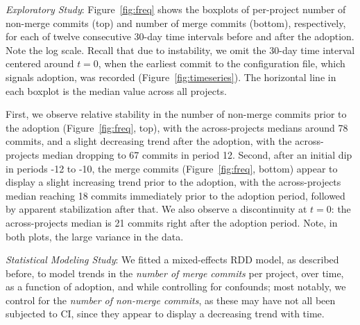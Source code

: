 \smallskip\noindent \emph{Exploratory Study}: 
Figure~\ref{fig:freq} shows the boxplots of per-project number of non-merge 
commits (top) and number of merge commits (bottom), respectively, for each
of twelve consecutive 30-day time intervals before and after the \Tvis adoption.
Note the log scale.
Recall that due to instability, we omit the 30-day time interval centered 
around $t = 0$, when the earliest commit to the \Tvi configuration file, which 
signals adoption, was recorded (Figure~\ref{fig:timeseries}).
The horizontal line in each boxplot is the median value across all projects.

First, we observe relative stability in the number of non-merge commits prior 
to the \Tvis adoption (Figure~\ref{fig:freq}, top), with the across-projects medians 
around 78 commits, and a slight decreasing trend after the adoption, with the
across-projects median dropping to 67 commits in period 12.
Second, after an initial dip in periods -12 to -10, the merge commits 
(Figure~\ref{fig:freq}, bottom) appear to display a slight increasing trend prior 
to the \Tvis adoption, with the across-projects median reaching 18 commits 
immediately prior to the adoption period, followed by apparent stabilization 
after that.
We also observe a discontinuity at $t=0$: the across-projects median is 21 
commits right after the adoption period.
Note, in both plots, the large variance in the data.



\smallskip\noindent \emph{Statistical Modeling Study}: 
We fitted a mixed-effects RDD model, as described before, to model trends
in the \emph{number of merge commits} per project, over time, as a function 
of \Tvis adoption, and while controlling for confounds; most notably, we control 
for the \emph{number of non-merge commits}, as these may have not all been 
subjected to CI, since they appear to display a decreasing trend with time.

